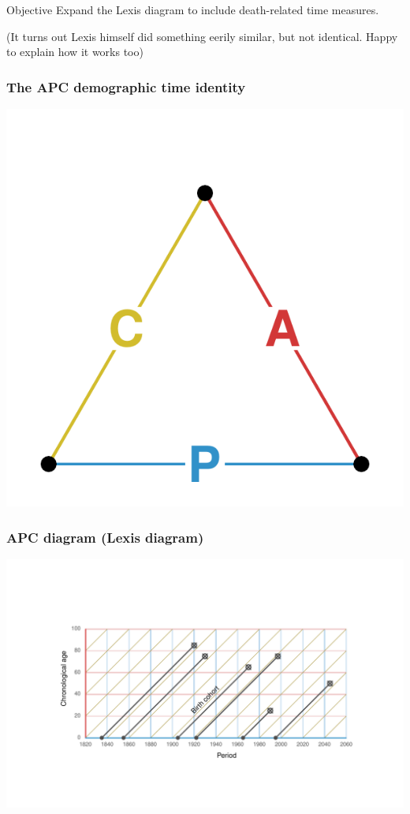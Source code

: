 \documentclass[20pt]{beamer}
\begin{document}
\begin{frame}
\begin{block}{Objective}
Expand the Lexis diagram to include death-related time measures.
\end{block}
\color{mygray}(It turns out Lexis himself did something eerily similar, but not
identical. Happy to explain how it works too)
\end{frame}

\begin{frame}
\frametitle{The APC demographic time identity}
\vspace{-4em}
\begin{center}
\includegraphics[scale=1.7]{Figures/APCid.pdf}
\end{center}
\end{frame}


\begin{frame}
\frametitle{APC diagram (Lexis diagram)}
\begin{center}
\includegraphics[trim= 200 200 200 200, scale=1.5]{Figures/APCrt.pdf}
\end{center}
\end{frame}
\end{document}

